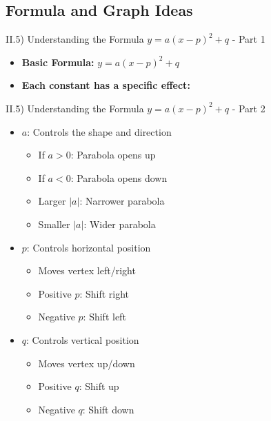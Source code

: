 \documentclass[aspectratio=169]{beamer}
\begin{document}
\subsection{Formula and Graph Ideas}

\begin{frame}{II.5) Understanding the Formula $y = a(x-p)^2 + q$ - Part 1}
    \begin{tcolorbox}[colback=lightgray,colframe=primary,title=Formula Components]
        \footnotesize
        \begin{itemize}
            \item \textbf{Basic Formula:} $y = a(x-p)^2 + q$
            \item \textbf{Each constant has a specific effect:}
        \end{itemize}
    \end{tcolorbox}
\end{frame}

\begin{frame}{II.5) Understanding the Formula $y = a(x-p)^2 + q$ - Part 2}
    \begin{tcolorbox}[colback=lightgray,colframe=primary,title=Constant Effects (Cont.)]
        \footnotesize
        \begin{itemize}
            \item $a$: Controls the shape and direction
                \begin{itemize}
                    \item If $a > 0$: Parabola opens up
                    \item If $a < 0$: Parabola opens down
                    \item Larger $|a|$: Narrower parabola
                    \item Smaller $|a|$: Wider parabola
                \end{itemize}
            \item $p$: Controls horizontal position
                \begin{itemize}
                    \item Moves vertex left/right
                    \item Positive $p$: Shift right
                    \item Negative $p$: Shift left
                \end{itemize}
            \item $q$: Controls vertical position
                \begin{itemize}
                    \item Moves vertex up/down
                    \item Positive $q$: Shift up
                    \item Negative $q$: Shift down
                \end{itemize}
        \end{itemize}
    \end{tcolorbox}
\end{frame}
\end{document}
